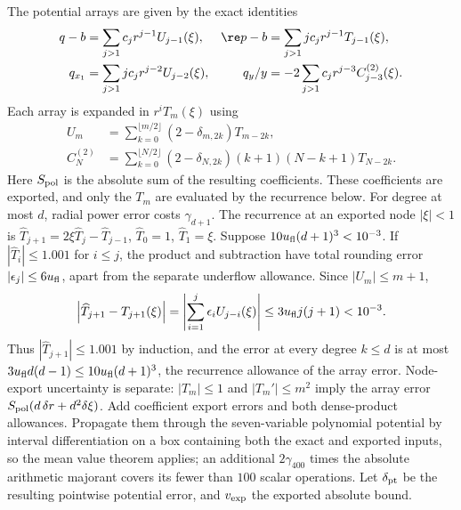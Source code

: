 The potential arrays are given by the exact identities
\begin{equation}\label{gd:eq:potential-arrays}
 \begin{aligned}
 q-b&=\sum_{j>1}c_jr^{j-1}U_{j-1}(\xi),&
 \re p-b&=\sum_{j>1}jc_jr^{j-1}T_{j-1}(\xi),\\
 q_{x_1}&=\sum_{j>1}jc_jr^{j-2}U_{j-2}(\xi),&
 q_y/y&=-2\sum_{j>1}c_jr^{j-3}C_{j-3}^{(2)}(\xi).
 \end{aligned}
\end{equation}
Each array is expanded in $r^iT_m(\xi)$ using
\[
 \begin{split}
 U_m&=\sum_{k=0}^{\lfloor m/2\rfloor}(2-\delta_{m,2k})T_{m-2k},\\
 C_N^{(2)}&=\sum_{k=0}^{\lfloor N/2\rfloor}
       (2-\delta_{N,2k})(k+1)(N-k+1)T_{N-2k}.
 \end{split}
\]
Here $S_{\rm pol}$ is the absolute sum of the resulting coefficients.
These coefficients are exported, and only the $T_m$ are evaluated by
the recurrence below.
For degree at most $d$, radial power error costs $\gamma_{d+1}$.
The recurrence at an exported node $|\xi|<1$ is
$\widehat T_{j+1}=2\xi\widehat T_j-\widehat T_{j-1}$,
$\widehat T_0=1$, $\widehat T_1=\xi$.
Suppose $10u_{\rm fl}(d+1)^3<10^{-3}$. If
$|\widehat T_i|\le1.001$ for $i\le j$, the product and subtraction
have total rounding error $|\epsilon_j|\le6u_{\rm fl}$, apart from
the separate underflow allowance. Since $|U_m|\le m+1$,
\[
 \left|\widehat T_{j+1}-T_{j+1}(\xi)\right|
 =\left|\sum_{i=1}^j\epsilon_iU_{j-i}(\xi)\right|
 \le3u_{\rm fl}j(j+1)<10^{-3}.
\]
Thus $|\widehat T_{j+1}|\le1.001$ by induction, and the error at
every degree $k\le d$ is at most
$3u_{\rm fl}d(d-1)\le10u_{\rm fl}(d+1)^3$, the recurrence allowance
of the array error.
Node-export uncertainty is separate: $|T_m|\le1$ and
$|T_m'|\le m^2$ imply the array error
$S_{\rm pol}(d\,\delta r+d^2\delta\xi)$.
Add coefficient export errors and both dense-product allowances.
Propagate them through the seven-variable polynomial potential by
interval differentiation on a box containing both the exact and
exported inputs, so the mean value theorem applies; an additional $2\gamma_{400}$ times the
absolute arithmetic majorant covers its fewer than $100$ scalar
operations. Let $\delta_{\rm pt}$ be the resulting pointwise potential error,
and $v_{\rm exp}$ the exported absolute bound.

